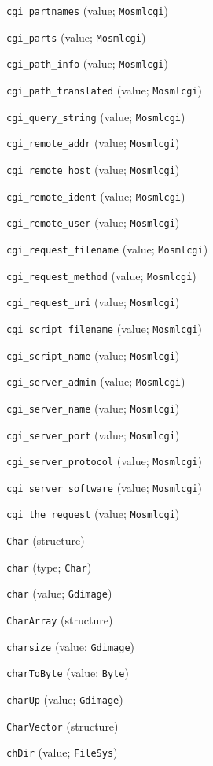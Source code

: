 \begin{description}
\item[] \verb"cgi_partnames" (value; \verb"Mosmlcgi")
\item[] \verb"cgi_parts" (value; \verb"Mosmlcgi")
\item[] \verb"cgi_path_info" (value; \verb"Mosmlcgi")
\item[] \verb"cgi_path_translated" (value; \verb"Mosmlcgi")
\item[] \verb"cgi_query_string" (value; \verb"Mosmlcgi")
\item[] \verb"cgi_remote_addr" (value; \verb"Mosmlcgi")
\item[] \verb"cgi_remote_host" (value; \verb"Mosmlcgi")
\item[] \verb"cgi_remote_ident" (value; \verb"Mosmlcgi")
\item[] \verb"cgi_remote_user" (value; \verb"Mosmlcgi")
\item[] \verb"cgi_request_filename" (value; \verb"Mosmlcgi")
\item[] \verb"cgi_request_method" (value; \verb"Mosmlcgi")
\item[] \verb"cgi_request_uri" (value; \verb"Mosmlcgi")
\item[] \verb"cgi_script_filename" (value; \verb"Mosmlcgi")
\item[] \verb"cgi_script_name" (value; \verb"Mosmlcgi")
\item[] \verb"cgi_server_admin" (value; \verb"Mosmlcgi")
\item[] \verb"cgi_server_name" (value; \verb"Mosmlcgi")
\item[] \verb"cgi_server_port" (value; \verb"Mosmlcgi")
\item[] \verb"cgi_server_protocol" (value; \verb"Mosmlcgi")
\item[] \verb"cgi_server_software" (value; \verb"Mosmlcgi")
\item[] \verb"cgi_the_request" (value; \verb"Mosmlcgi")
\item[] \verb"Char" (structure)
\item[] \verb"char" (type; \verb"Char")
\item[] \verb"char" (value; \verb"Gdimage")
\item[] \verb"CharArray" (structure)
\item[] \verb"charsize" (value; \verb"Gdimage")
\item[] \verb"charToByte" (value; \verb"Byte")
\item[] \verb"charUp" (value; \verb"Gdimage")
\item[] \verb"CharVector" (structure)
\item[] \verb"chDir" (value; \verb"FileSys")

\end{description}
